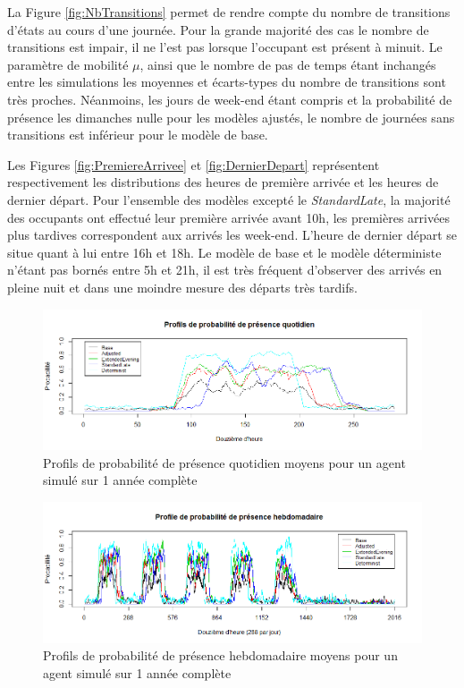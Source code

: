 La Figure \ref{fig:NbTransitions} permet de rendre compte du nombre de transitions d'états au cours d'une journée. Pour la grande majorité des cas le nombre de transitions est impair, il ne l'est pas lorsque l'occupant est présent à minuit. Le paramètre de mobilité $\mu$, ainsi que le nombre de pas de temps étant inchangés entre les simulations les moyennes et écarts-types du nombre de transitions sont très proches. Néanmoins, les jours de week-end étant compris et la probabilité de présence les dimanches nulle pour les modèles ajustés, le nombre de journées sans transitions est inférieur pour le modèle de base.

Les Figures \ref{fig:PremiereArrivee} et \ref{fig:DernierDepart} représentent respectivement les distributions des heures de première arrivée et les heures de dernier départ. Pour l'ensemble des modèles excepté le \textit{StandardLate}, la majorité des occupants ont effectué leur première arrivée avant 10h, les premières arrivées plus tardives correspondent aux arrivés les week-end. L'heure de dernier départ se situe quant à lui entre 16h et 18h. Le modèle de base et le modèle déterministe n'étant pas bornés entre 5h et 21h, il est très fréquent d'observer des arrivés en pleine nuit et dans une moindre mesure des départs très tardifs.

\begin{figure}
\centering
\includegraphics[scale=0.45]{Images/PageActivities/PresenceQ}
\caption{Profils de probabilité de présence quotidien moyens pour un agent simulé sur 1 année complète}
\label{fig:PresenceQ}
\end{figure}

\begin{figure}
\centering
\includegraphics[scale=0.45]{Images/PageActivities/PresenceH}
\caption{Profils de probabilité de présence hebdomadaire moyens pour un agent simulé sur 1 année complète}
\label{fig:PresenceH}
\end{figure}

